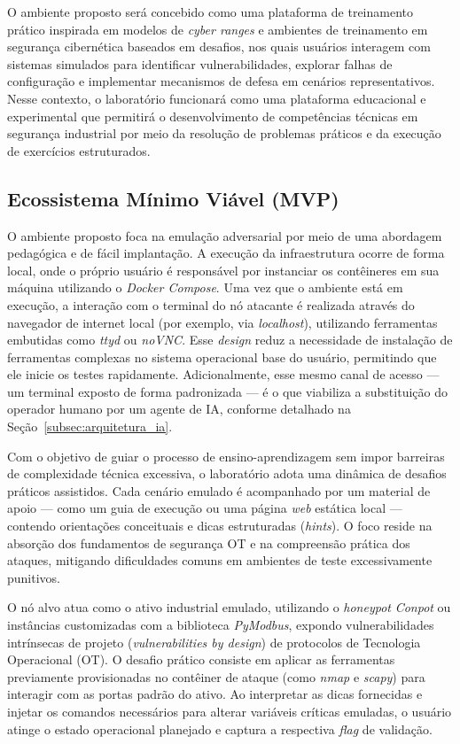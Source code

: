 \documentclass[conference]{IEEEtran}
\begin{document}
O ambiente proposto será concebido como uma plataforma de treinamento prático inspirada em modelos de \textit{cyber ranges} e ambientes de treinamento em segurança cibernética baseados em desafios, nos quais usuários interagem com sistemas simulados para identificar vulnerabilidades, explorar falhas de configuração e implementar mecanismos de defesa em cenários representativos. Nesse contexto, o laboratório funcionará como uma plataforma educacional e experimental que permitirá o desenvolvimento de competências técnicas em segurança industrial por meio da resolução de problemas práticos e da execução de exercícios estruturados.

\subsection{Ecossistema Mínimo Viável (MVP)}
\label{subsec:primeira_iteracao}
O ambiente proposto foca na emulação adversarial por meio de uma abordagem pedagógica e de fácil implantação. A execução da infraestrutura ocorre de forma local, onde o próprio usuário é responsável por instanciar os contêineres em sua máquina utilizando o \textit{Docker Compose}. Uma vez que o ambiente está em execução, a interação com o terminal do nó atacante é realizada através do navegador de internet local (por exemplo, via \textit{localhost}), utilizando ferramentas embutidas como \textit{ttyd} ou \textit{noVNC}. Esse \textit{design} reduz a necessidade de instalação de ferramentas complexas no sistema operacional base do usuário, permitindo que ele inicie os testes rapidamente. Adicionalmente, esse mesmo canal de acesso --- um terminal exposto de forma padronizada --- é o que viabiliza a substituição do operador humano por um agente de IA, conforme detalhado na Seção~\ref{subsec:arquitetura_ia}.

Com o objetivo de guiar o processo de ensino-aprendizagem sem impor barreiras de complexidade técnica excessiva, o laboratório adota uma dinâmica de desafios práticos assistidos. Cada cenário emulado é acompanhado por um material de apoio --- como um guia de execução ou uma página \textit{web} estática local --- contendo orientações conceituais e dicas estruturadas (\textit{hints}). O foco reside na absorção dos fundamentos de segurança OT e na compreensão prática dos ataques, mitigando dificuldades comuns em ambientes de teste excessivamente punitivos.

O nó alvo atua como o ativo industrial emulado, utilizando o \textit{honeypot} \textit{Conpot} ou instâncias customizadas com a biblioteca \textit{PyModbus}, expondo vulnerabilidades intrínsecas de projeto (\textit{vulnerabilities by design}) de protocolos de Tecnologia Operacional (OT). O desafio prático consiste em aplicar as ferramentas previamente provisionadas no contêiner de ataque (como \textit{nmap} e \textit{scapy}) para interagir com as portas padrão do ativo. Ao interpretar as dicas fornecidas e injetar os comandos necessários para alterar variáveis críticas emuladas, o usuário atinge o estado operacional planejado e captura a respectiva \textit{flag} de validação.
\end{document}
